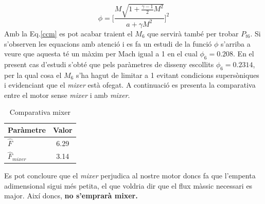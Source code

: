 \begin{equation}
\label{phi}
\phi = \Bigg[ \frac{M\sqrt{1+\frac{\gamma-1}{2}M^2}}{a+\gamma M^2}\Bigg]^2
\end{equation}
Amb la Eq.\ref{ccm} es pot acabar traient el $M_6$ que servirà també per trobar $P_{t6}$. Si s'observen les equacions amb atenció i es fa un estudi de la funció $\phi$ s'arriba a veure que aquesta té un màxim per Mach igual a 1 en el cual $\phi_6=0.208$. En el present cas d'estudi s'obté que pels paràmetres de disseny escollits $\phi_6=0.2314$, per la qual cosa el $M_6$ s'ha hagut de limitar a 1 evitant condicions supersòniques i evidenciant que el \textit{mixer} està ofegat.
A continuació es presenta la comparativa entre el motor sense \textit{mixer} i amb \textit{mixer}.
\begin{table}[H]
	\centering
	\begin{tabular}{lc}
		\toprule[3pt]
		\textbf{Paràmetre}&\textbf{Valor}\\
		\midrule[1pt]
		$\hat{F}$ & 6.29 \\
		$\hat{F}_{mixer}$ & 3.14 \\
		\bottomrule[2pt]
	\end{tabular}
	\label{C_opti2}
	\caption{Comparativa mixer}
\end{table}
\noindent Es pot concloure que el\textit{ mixer} perjudica al nostre motor doncs fa que l'empenta adimensional sigui més petita, el que voldria dir que el flux màssic necessari es major. Així doncs,\textbf{ no s'emprarà mixer.}